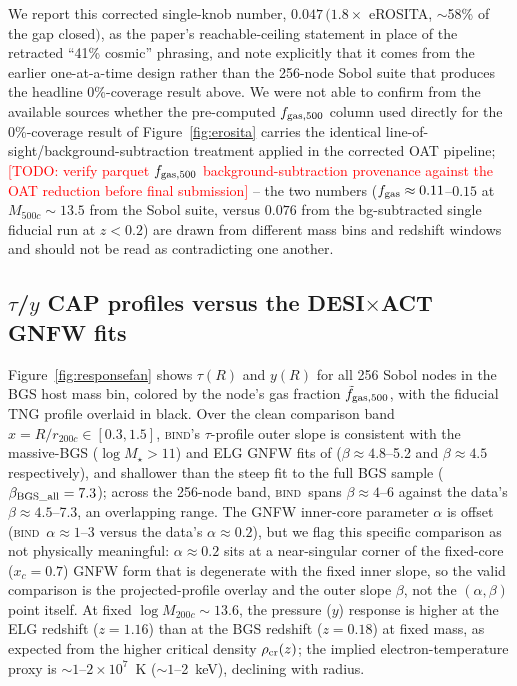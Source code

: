 \documentclass[11pt]{article}
\newcommand{\bind}{\textsc{bind}}
\newcommand{\fgas}{f_{\rm gas}}
\newcommand{\Mhalo}{M_{200c}}
\newcommand{\Mfive}{M_{500c}}
\newcommand{\todo}[1]{\textcolor{red}{[TODO: #1]}}
\begin{document}
We report this corrected single-knob number, $0.047\,(1.8\times$ eROSITA,
$\sim$58\% of the gap closed$)$, as the paper's reachable-ceiling statement in
place of the retracted ``41\% cosmic'' phrasing, and note explicitly that it
comes from the earlier one-at-a-time design rather than the 256-node Sobol
suite that produces the headline 0\%-coverage result above. We were not able
to confirm from the available sources whether the pre-computed $f_{\rm gas,500}$
column used directly for the 0\%-coverage result of Figure~\ref{fig:erosita}
carries the identical line-of-sight/background-subtraction treatment applied
in the corrected OAT pipeline; \todo{verify parquet $f_{\rm gas,500}$ background-subtraction
provenance against the OAT reduction before final submission} -- the two
numbers ($\fgas\approx0.11$--$0.15$ at $\Mfive\sim13.5$ from the Sobol suite,
versus $0.076$ from the bg-subtracted single fiducial run at $z<0.2$) are
drawn from different mass bins and redshift windows and should not be read as
contradicting one another.

\subsection{$\tau$/$y$ CAP profiles versus the DESI$\times$ACT GNFW fits}\label{sec:results2}

Figure~\ref{fig:responsefan} shows $\tau(R)$ and $y(R)$ for all 256 Sobol nodes
in the BGS host mass bin, colored by the node's gas fraction $\tilde{f}_{\rm gas,500}$,
with the fiducial TNG profile overlaid in black. Over the clean comparison band
$x=R/r_{200c}\in[0.3,1.5]$, \bind's $\tau$-profile outer slope is consistent
with the massive-BGS ($\log M_\star{>}11$) and ELG GNFW fits of
\citet{kszpartII} ($\beta\approx4.8$--5.2 and $\beta\approx4.5$ respectively),
and shallower than the steep fit to the full BGS sample
($\beta_{\rm BGS\_all}=7.3$); across the 256-node band, \bind\ spans
$\beta\approx4$--6 against the data's $\beta\approx4.5$--7.3, an overlapping
range. %
The GNFW inner-core parameter $\alpha$ is offset (\bind\ $\alpha\approx1$--3
versus the data's $\alpha\approx0.2$), but we flag this specific comparison as
not physically meaningful: $\alpha\approx0.2$ sits at a near-singular corner of
the fixed-core ($x_c=0.7$) GNFW form that is degenerate with the fixed inner
slope, so the valid comparison is the projected-profile overlay and the outer
slope $\beta$, not the $(\alpha,\beta)$ point itself. %
At fixed $\log\Mhalo\sim13.6$, the pressure ($y$) response is higher at the
ELG redshift ($z=1.16$) than at the BGS redshift ($z=0.18$) at fixed mass, as
expected from the higher critical density $\rho_{\rm cr}(z)$; the implied
electron-temperature proxy is $\sim1$--$2\times10^7$~K ($\sim1$--2~keV),
declining with radius. %
\end{document}
